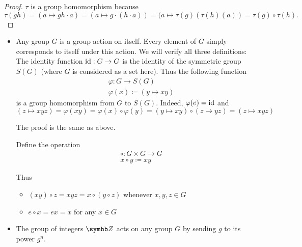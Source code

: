\begin{proof}
  \( \tau \) is a group homomorphism because
  \begin{equation*}
    \tau(g h)
    =
    (a \mapsto gh \cdot a)
    =
    (a \mapsto g \cdot (h \cdot a))
    =
    (a \mapsto \tau(g)(\tau(h)(a))
    =
    \tau(g) \circ \tau(h).
  \end{equation*}
\end{proof}

\begin{example}\label{ex:group_actions}
  \begin{itemize}\mbox{}
    \item Any group \( G \) is a group action on itself. Every element of \( G \) simply corresponds to itself under this action. We will verify all three definitions:
           The identity function \( \operatorname{id}: G \to G \) is the identity of the symmetric group \( S(G) \) (where \( G \) is considered as a set here). Thus the following function
          \begin{align*}
             & \varphi: G \to S(G)                 \\
             & \varphi(x) \coloneqq (y \mapsto xy)
          \end{align*}
          is a group homomorphism from \( G \) to \( S(G) \). Indeed, \( \varphi(e) = \operatorname{id} \) and
          \begin{equation*}
            (z \mapsto xyz) = \varphi(xy) = \varphi(x) \circ \varphi(y) = (y \mapsto xy) \circ (z \mapsto yz) = (z \mapsto xyz)
          \end{equation*}

           The proof is the same as above.

           Define the operation
          \begin{align*}
             & \circ: G \times G \to G \\
             & x \circ y \coloneqq xy
          \end{align*}

          Thus
          \begin{itemize}
            \item \( (x y) \circ z = xyz = x \circ (y \circ z) \) whenever \( x, y, z \in G \)
            \item \( e \circ x = ex = x \) for any \( x \in G \)
          \end{itemize}

    \item The group of integers \( \BZ \) acts on any group \( G \) by sending \( g \) to its power \( g^n \).
  \end{itemize}
\end{example}

